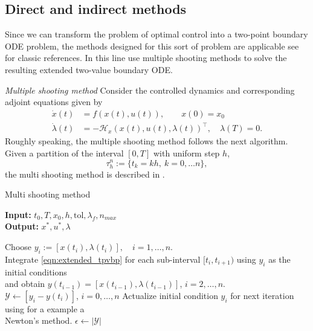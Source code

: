 \subsection{Direct and indirect methods}
Since we can transform the problem of optimal control into a two-point 
boundary ODE problem, the methods designed for this sort of problem are 
applicable see \cite{Keller1976, Ascher1987, Stoer2013} for classic references. 
In this line \cite{Caetano2001,Yan2008} use multiple shooting methods to 
solve the resulting extended two-value boundary ODE.

{\it Multiple shooting method}
Consider the controlled dynamics and corresponding adjoint equations given by
\begin{equation}
  \label{eqn:extended_tpvbp}
  \begin{aligned}
    \dot{x}(t) &= 
    f(x(t), u(t)), \qquad x(0)=x_0 \\
    \dot{\lambda}(t) &=
    -\mathcal{H}_x(x(t),u(t),\lambda(t))^\top, \quad 
    \lambda(T)=0.
  \end{aligned}
\end{equation}
Roughly speaking, the multiple shooting method follows the next algorithm.
Given a partition of the interval $[0, T]$ with uniform step $h$,
$$
\tau_h^n:= \{t_k = kh, \ k=0,\dots n\},
$$
the multi shooting method is described in .
\begin{algorithm}
  \caption{Multi shooting method } \label{alg:multishooting}
  \begin{flushleft}
    \hspace*{\algorithmicindent} \textbf{Input:} 
    $t_0, T, x_0, h, \text{tol}, \lambda_{f}, n_{max}$ \\
    \hspace*{\algorithmicindent} \textbf{Output:} 
    $x^*, u^*, \lambda$
  \end{flushleft}
  \begin{algorithmic}
        \State 
         Choose $y_i := [x(t_i ), \lambda(t_i )], \quad i = 1,\dots, n$.
        \\
        \State 
          Integrate \eqref{eqn:extended_tpvbp} for each sub-interval 
          $[t_i , t_{i+1})$ using $y_i$ as the initial conditions 
          \\
          \hspace{.98cm}
          and obtain 
          $y(t_{i−1}) = [x(t_{i−1}), \lambda(t_{i−1})]$, 
          $i=2, \dots, n$.
        \\
        \State 
          $\mathcal{Y} \gets [y_i - y(t_i)]$, $i=0, \dots, n$
        \State
          Actualize initial condition $y_i$ for next iteration
          using for a example a
          \\
          \hspace{.98cm}
           Newton's method.
        \State
          $\epsilon \gets |\mathcal{Y}|$  
      \EndWhile
     \EndProcedure
  \end{algorithmic}
\end{algorithm}



